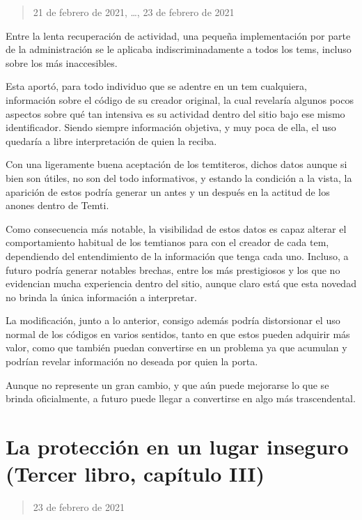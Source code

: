 \documentclass[
]{book}
\begin{document}
\begin{quote}
21 de febrero de 2021, \ldots, 23 de febrero de 2021
\end{quote}

Entre la lenta recuperación de actividad, una pequeña implementación por parte de la administración se le aplicaba indiscriminadamente a todos los tems, incluso sobre los más inaccesibles.

Esta aportó, para todo individuo que se adentre en un tem cualquiera, información sobre el código de su creador original, la cual revelaría algunos pocos aspectos sobre qué tan intensiva es su actividad dentro del sitio bajo ese mismo identificador. Siendo siempre información objetiva, y muy poca de ella, el uso quedaría a libre interpretación de quien la reciba.

Con una ligeramente buena aceptación de los temtiteros, dichos datos aunque si bien son útiles, no son del todo informativos, y estando la condición a la vista, la aparición de estos podría generar un antes y un después en la actitud de los anones dentro de Temti.

Como consecuencia más notable, la visibilidad de estos datos es capaz alterar el comportamiento habitual de los temtianos para con el creador de cada tem, dependiendo del entendimiento de la información que tenga cada uno. Incluso, a futuro podría generar notables brechas, entre los más prestigiosos y los que no evidencian mucha experiencia dentro del sitio, aunque claro está que esta novedad no brinda la única información a interpretar.

La modificación, junto a lo anterior, consigo además podría distorsionar el uso normal de los códigos en varios sentidos, tanto en que estos pueden adquirir más valor, como que también puedan convertirse en un problema ya que acumulan y podrían revelar información no deseada por quien la porta.

Aunque no represente un gran cambio, y que aún puede mejorarse lo que se brinda oficialmente, a futuro puede llegar a convertirse en algo más trascendental.

\hypertarget{la-protecciuxf3n-en-un-lugar-inseguro-tercer-libro-capuxedtulo-iii}{%
\section{La protección en un lugar inseguro (Tercer libro, capítulo III)}\label{la-protecciuxf3n-en-un-lugar-inseguro-tercer-libro-capuxedtulo-iii}}

\begin{quote}
23 de febrero de 2021
\end{quote}
\end{document}
